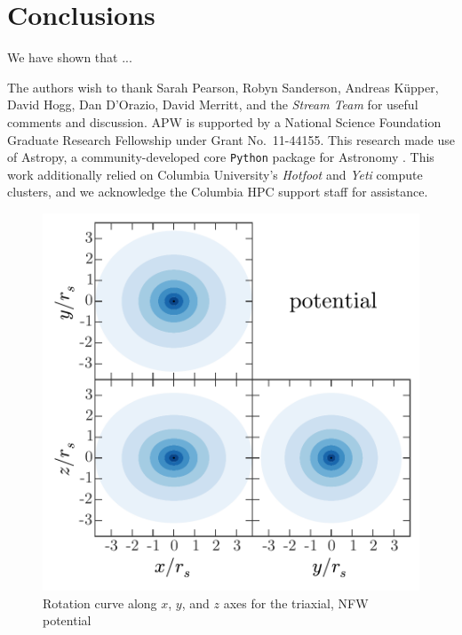 \documentclass[letterpaper,12pt,preprint]{aastex}
\begin{document}
\section{Conclusions}\label{sec:conclusions}
We have shown that ...

\acknowledgements
The authors wish to thank Sarah Pearson, Robyn Sanderson, Andreas K\"upper, David Hogg, Dan D'Orazio, David Merritt, and the \emph{Stream Team} for useful comments and discussion.
APW is supported by a National Science Foundation Graduate Research Fellowship under Grant No.\ 11-44155. 
This research made use of Astropy, a community-developed core \texttt{Python} package for Astronomy \citep{astropy13}.
This work additionally relied on Columbia University's \emph{Hotfoot} and \emph{Yeti} compute clusters, and we acknowledge the Columbia HPC support staff for assistance.



\clearpage

\begin{figure}[!p]
\begin{center}
\includegraphics[width=\textwidth]{figures/potential.pdf}
\caption{Rotation curve along $x$, $y$, and $z$ axes for the triaxial, NFW potential } \label{fig:potential}
\end{center}
\end{figure}
\end{document}

